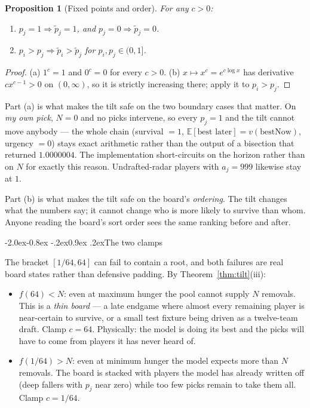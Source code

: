 \documentclass[10pt,a4paper]{article}
\makeatletter
\theoremstyle{plain}
\newtheorem{proposition}[theorem]{Proposition}
\theoremstyle{definition}
\theoremstyle{remark}
\renewcommand\subsection{\@startsection{subsection}{2}{\z@}%
  {-2.0ex\@plus -0.8ex \@minus -.2ex}{0.9ex \@plus .2ex}{\normalfont\large\bfseries}}
\makeatother
\begin{document}
\begin{proposition}[Fixed points and order]
\label{prop:tiltprops}
For any $c > 0$:
\begin{enumerate}
\item[(a)] $p_j = 1 \Rightarrow \tilde p_j = 1$, and $p_j = 0 \Rightarrow \tilde p_j = 0$.
\item[(b)] $p_i > p_j \Rightarrow \tilde p_i > \tilde p_j$ for $p_i, p_j \in (0,1]$.
\end{enumerate}
\end{proposition}

\begin{proof}
(a) $1^c = 1$ and $0^c = 0$ for every $c > 0$.
(b) $x \mapsto x^c = e^{c\log x}$ has derivative $c x^{c-1} > 0$ on $(0,\infty)$, so it
is strictly increasing there; apply it to $p_i > p_j$.
\end{proof}

Part (a) is what makes the tilt safe on the two boundary cases that matter. On \emph{my
own pick}, $N = 0$ and no picks intervene, so every $p_j = 1$ and the tilt cannot move
anybody --- the whole chain (survival $=1$, $\mathbb{E}[\text{best later}] =
v(\text{bestNow})$, urgency $= 0$) stays exact arithmetic rather than the output of a
bisection that returned $1.0000004$. The implementation short-circuits on the horizon
rather than on $N$ for exactly this reason. Undrafted-radar players with $a_j = 999$
likewise stay at $1$.

Part (b) is what makes the tilt safe on the board's \emph{ordering}. The tilt changes
what the numbers say; it cannot change who is more likely to survive than whom. Anyone
reading the board's sort order sees the same ranking before and after.

\subsection{The two clamps}

The bracket $[1/64, 64]$ can fail to contain a root, and both failures are real board
states rather than defensive padding. By Theorem~\ref{thm:tilt}(iii):

\begin{itemize}
\item $f(64) < N$: even at maximum hunger the pool cannot supply $N$ removals. This is
a \emph{thin board} --- a late endgame where almost every remaining player is
near-certain to survive, or a small test fixture being driven as a twelve-team draft.
Clamp $c = 64$. Physically: the model is doing its best and the picks will have to come
from players it has never heard of.

\item $f(1/64) > N$: even at minimum hunger the model expects more than $N$ removals.
The board is stacked with players the model has already written off (deep fallers with
$p_j$ near zero) while too few picks remain to take them all. Clamp $c = 1/64$.
\end{itemize}
\end{document}
